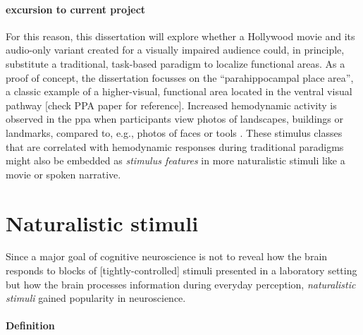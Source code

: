 \paragraph{excursion to current project}


%
For this reason, this dissertation will explore whether a Hollywood movie and
its audio-only variant created for a visually impaired audience could, in
principle, substitute a traditional, task-based paradigm to localize functional
areas.
%
As a proof of concept, the dissertation focusses on the ``parahippocampal place
area'', a classic example of a higher-visual, functional area
\citep{epstein1998ppa, epstein1999parahippocampal} located in the ventral visual
pathway [check PPA paper for reference].
Increased hemodynamic activity is observed in the \ac{ppa} when participants
view photos of landscapes, buildings or landmarks, compared to, e.g., photos of
faces or tools \citep[see reviews][]{epstein2014neural, aminoff2013role}.
%
These stimulus classes that are correlated with hemodynamic responses during
traditional paradigms might also be embedded as \textit{stimulus features} in
more naturalistic stimuli like a movie or spoken narrative.


\section{Naturalistic stimuli}
%
Since a major goal of cognitive neuroscience is not to reveal how the brain
responds to blocks of [tightly-controlled] stimuli presented in a laboratory
setting but how the brain processes information during everyday perception,
\textit{naturalistic stimuli} gained popularity in neuroscience.


\paragraph{Definition}

